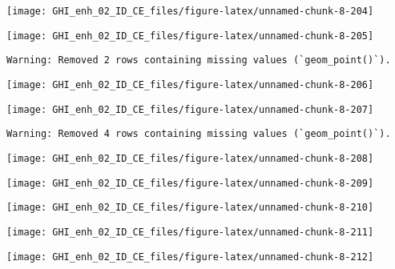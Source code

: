 \documentclass[
  10pt,
  a4paper,oneside]{article}
\begin{document}
\begin{center}\texttt{[image: GHI\_enh\_02\_ID\_CE\_files/figure-latex/unnamed-chunk-8-204]} \end{center}

\begin{center}\texttt{[image: GHI\_enh\_02\_ID\_CE\_files/figure-latex/unnamed-chunk-8-205]} \end{center}

\begin{verbatim}
Warning: Removed 2 rows containing missing values (`geom_point()`).
\end{verbatim}

\begin{center}\texttt{[image: GHI\_enh\_02\_ID\_CE\_files/figure-latex/unnamed-chunk-8-206]} \end{center}

\begin{center}\texttt{[image: GHI\_enh\_02\_ID\_CE\_files/figure-latex/unnamed-chunk-8-207]} \end{center}

\begin{verbatim}
Warning: Removed 4 rows containing missing values (`geom_point()`).
\end{verbatim}

\begin{center}\texttt{[image: GHI\_enh\_02\_ID\_CE\_files/figure-latex/unnamed-chunk-8-208]} \end{center}

\begin{center}\texttt{[image: GHI\_enh\_02\_ID\_CE\_files/figure-latex/unnamed-chunk-8-209]} \end{center}

\begin{center}\texttt{[image: GHI\_enh\_02\_ID\_CE\_files/figure-latex/unnamed-chunk-8-210]} \end{center}

\begin{center}\texttt{[image: GHI\_enh\_02\_ID\_CE\_files/figure-latex/unnamed-chunk-8-211]} \end{center}

\begin{center}\texttt{[image: GHI\_enh\_02\_ID\_CE\_files/figure-latex/unnamed-chunk-8-212]} \end{center}
\end{document}

